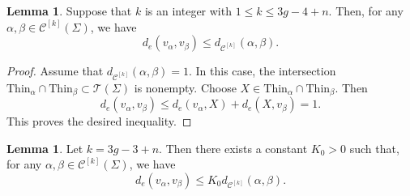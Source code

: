 \documentclass[a4paper,11pt]{amsart}
\numberwithin{equation}{section}
\theoremstyle{definition}
\newtheorem{lemma}[theorem]{Lemma}
\newcommand{\Teich}{\mathcal{T}}
\newcommand{\Thin}{\mathrm{Thin}}
\newcommand{\multicurve}[1]{\mathcal{C}^{[#1]}}
\begin{document}
\begin{lemma}\label{lemma:LipschitzPropertyForTheMapI1}
    Suppose that $k$ is an integer with $1 \le k \le 3g-4+n$.
    Then, for any $\alpha,\beta \in \multicurve{k}(\Sigma)$, we have
    \begin{equation*}
        d_e(v_\alpha, v_\beta) \le d_{\multicurve{k}}(\alpha,\beta).
    \end{equation*}
\end{lemma}

\begin{proof}
    Assume that $d_{\multicurve{k}}(\alpha,\beta) = 1$.
    In this case, the intersection $\Thin_\alpha \cap \Thin_\beta \subset \Teich(\Sigma)$ is nonempty.
    Choose $X \in \Thin_\alpha \cap \Thin_\beta$.
    Then
    \begin{equation*}
        d_e(v_\alpha, v_\beta)
        \le d_e(v_\alpha, X) + d_e(X, v_\beta)
        = 1.
    \end{equation*}
    This proves the desired inequality.
\end{proof}

\begin{lemma}\label{lemma:LipschitzPropertyForTheMapI2}
    Let $k=3g-3+n$.
    Then there exists a constant $K_0>0$ such that, for any $\alpha,\beta\in\multicurve{k}(\Sigma)$, we have
    \begin{equation*}
        d_e(v_\alpha,v_\beta)\leq K_0 d_{\multicurve{k}}(\alpha,\beta).
    \end{equation*}
\end{lemma}
\end{document}
